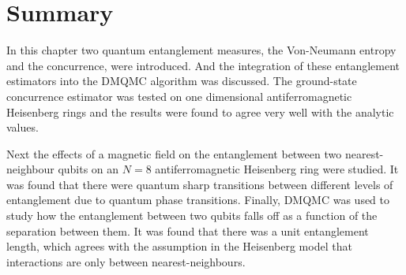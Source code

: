 \section{Summary}

In this chapter two quantum entanglement measures, the Von-Neumann entropy and the concurrence, were introduced. And the integration of these entanglement estimators into the DMQMC algorithm was discussed. The ground-state concurrence estimator was tested on one dimensional antiferromagnetic Heisenberg rings and the results were found to agree very well with the analytic values. 

Next the effects of a magnetic field on the entanglement between two nearest-neighbour qubits on an $N=8$ antiferromagnetic Heisenberg ring were studied.  It was found that there were quantum sharp transitions between different levels of entanglement due to quantum phase transitions. Finally, DMQMC was used to study how the entanglement between two qubits falls off as a function of the separation between them. It was found that there was a unit entanglement length, which agrees with the assumption in the Heisenberg model that interactions are only between nearest-neighbours.

